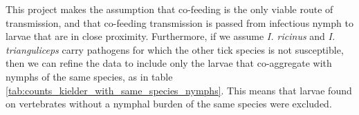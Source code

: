 \documentclass{article}
\begin{document}
This project makes the assumption that co-feeding is the only viable route of transmission, and that co-feeding transmission is passed from infectious nymph to larvae that are in close proximity. Furthermore, if we assume \textit{I. ricinus} and \textit{I. trianguliceps} carry pathogens for which the other tick species is not susceptible, then we can refine the data to include only the larvae that co-aggregate with nymphs of the same species, as in table \ref{tab:counts_kielder_with_same_species_nymphs}. This means that larvae found on vertebrates without a nymphal burden of the same species were excluded.

\end{document}
